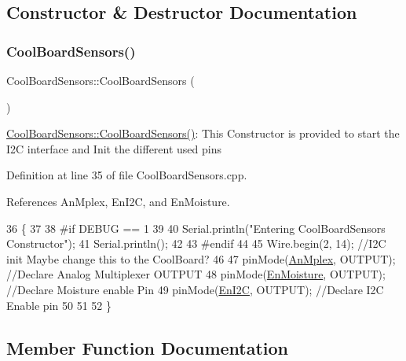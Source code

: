 \subsection{Constructor \& Destructor Documentation}
\mbox{\label{classCoolBoardSensors_a91ff2a02f5486f90cf2413a1cf8a9ed4}} 
\subsubsection{\texorpdfstring{Cool\+Board\+Sensors()}{CoolBoardSensors()}}
{\footnotesize\ttfamily Cool\+Board\+Sensors\+::\+Cool\+Board\+Sensors (\begin{DoxyParamCaption}{ }\end{DoxyParamCaption})}

\hyperlink{classCoolBoardSensors_a91ff2a02f5486f90cf2413a1cf8a9ed4}{Cool\+Board\+Sensors\+::\+Cool\+Board\+Sensors()}\+: This Constructor is provided to start the I2C interface and Init the different used pins 

Definition at line 35 of file Cool\+Board\+Sensors.\+cpp.



References An\+Mplex, En\+I2C, and En\+Moisture.


\begin{DoxyCode}
36 \{
37 
38 \textcolor{preprocessor}{#if DEBUG == 1}
39 
40     Serial.println(\textcolor{stringliteral}{"Entering CoolBoardSensors Constructor"});
41     Serial.println();
42 
43 \textcolor{preprocessor}{#endif}
44     
45     Wire.begin(2, 14);                       \textcolor{comment}{//I2C init Maybe change this to the CoolBoard?}
46 
47     pinMode(\hyperlink{classCoolBoardSensors_a12ef28b1046219e0aee10bf64e28c4a5}{AnMplex}, OUTPUT);                \textcolor{comment}{//Declare Analog Multiplexer OUTPUT}
48     pinMode(\hyperlink{classCoolBoardSensors_a6177d02e14a057a2f171a2e930b5038d}{EnMoisture}, OUTPUT);             \textcolor{comment}{//Declare Moisture enable Pin}
49     pinMode(\hyperlink{classCoolBoardSensors_aaa6b5dbf3a6633bffd9d204d961096dc}{EnI2C}, OUTPUT);           \textcolor{comment}{//Declare I2C Enable pin }
50 
51 
52 \}
\end{DoxyCode}


\subsection{Member Function Documentation}
\mbox{\label{classCoolBoardSensors_aa432c5aac88f89c31a10766390f23e0b}} 
